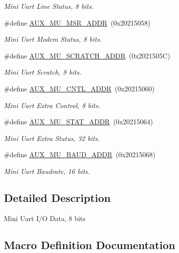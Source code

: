 \begin{DoxyCompactItemize}
\begin{DoxyCompactList}\small\item\em Mini Uart Line Status, 8 bits. \end{DoxyCompactList}\item 
\#define \hyperlink{group__UART_gad7e37af940a9ff96e6aba9d307b926be}{A\+U\+X\+\_\+\+M\+U\+\_\+\+M\+S\+R\+\_\+\+A\+D\+DR}~(0x20215058)
\begin{DoxyCompactList}\small\item\em Mini Uart Modem Status, 8 bits. \end{DoxyCompactList}\item 
\#define \hyperlink{group__UART_ga34eb1e827236c566957962b30be74496}{A\+U\+X\+\_\+\+M\+U\+\_\+\+S\+C\+R\+A\+T\+C\+H\+\_\+\+A\+D\+DR}~(0x2021505\+C)
\begin{DoxyCompactList}\small\item\em Mini Uart Scratch, 8 bits. \end{DoxyCompactList}\item 
\#define \hyperlink{group__UART_ga9c3d11375873d03e2bb8b93d3ae970fb}{A\+U\+X\+\_\+\+M\+U\+\_\+\+C\+N\+T\+L\+\_\+\+A\+D\+DR}~(0x20215060)
\begin{DoxyCompactList}\small\item\em Mini Uart Extra Control, 8 bits. \end{DoxyCompactList}\item 
\#define \hyperlink{group__UART_ga3ab600905dcef74e8756dcc8d54c6ef9}{A\+U\+X\+\_\+\+M\+U\+\_\+\+S\+T\+A\+T\+\_\+\+A\+D\+DR}~(0x20215064)
\begin{DoxyCompactList}\small\item\em Mini Uart Extra Status, 32 bits. \end{DoxyCompactList}\item 
\#define \hyperlink{group__UART_ga8430fd87ed60df61a2cf173f54c15549}{A\+U\+X\+\_\+\+M\+U\+\_\+\+B\+A\+U\+D\+\_\+\+A\+D\+DR}~(0x20215068)
\begin{DoxyCompactList}\small\item\em Mini Uart Baudrate, 16 bits. \end{DoxyCompactList}\end{DoxyCompactItemize}


\subsection{Detailed Description}
Mini Uart I/O Data, 8 bits 

\subsection{Macro Definition Documentation}
\mbox{\label{group__UART_ga8430fd87ed60df61a2cf173f54c15549}} 
